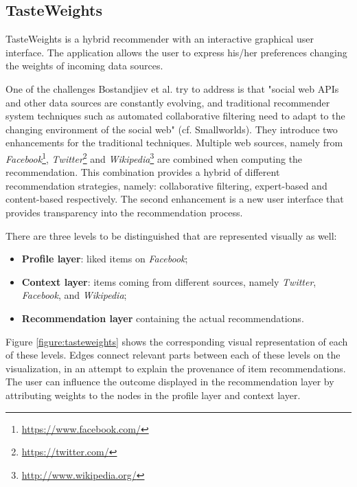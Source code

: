\subsection{TasteWeights}\label{chapter:survey:section:applications:subsection:tasteweights}

TasteWeights is a hybrid recommender with an interactive graphical user interface\cite{bostandjiev:2012}. The application allows the user to express his/her preferences changing the weights of incoming data sources.

One of the challenges Bostandjiev et al. try to address is that "social web APIs and other data sources are constantly evolving, and traditional recommender system techniques such as automated collaborative filtering need to adapt to the changing environment of the social web"\cite{bostandjiev:2012} (cf. Smallworlds). They introduce two enhancements for the traditional techniques. Multiple web sources, namely from \emph{Facebook}\footnote{\url{https://www.facebook.com/}}, \emph{Twitter}\footnote{\url{https://twitter.com/}} and \emph{Wikipedia}\footnote{\url{http://www.wikipedia.org/}} are combined when computing the recommendation. This combination provides a hybrid of different recommendation strategies, namely: collaborative filtering, expert-based and content-based respectively. The second enhancement is a new user interface that provides transparency into the recommendation process.

There are three levels to be distinguished that are represented visually as well:

\begin{itemize}
	\item \textbf{Profile layer}: liked items on \emph{Facebook};
	\item \textbf{Context layer}: items coming from different sources, namely \emph{Twitter}, \emph{Facebook}, and \emph{Wikipedia};
	\item \textbf{Recommendation layer} containing the actual recommendations.
\end{itemize}

Figure \ref{figure:tasteweights} shows the corresponding visual representation of each of these levels. Edges connect relevant parts between each of these levels on the visualization, in an attempt to explain the provenance of item recommendations. The user can influence the outcome displayed in the recommendation layer by attributing weights to the nodes in the profile layer and context layer\cite{bostandjiev:2012}.

